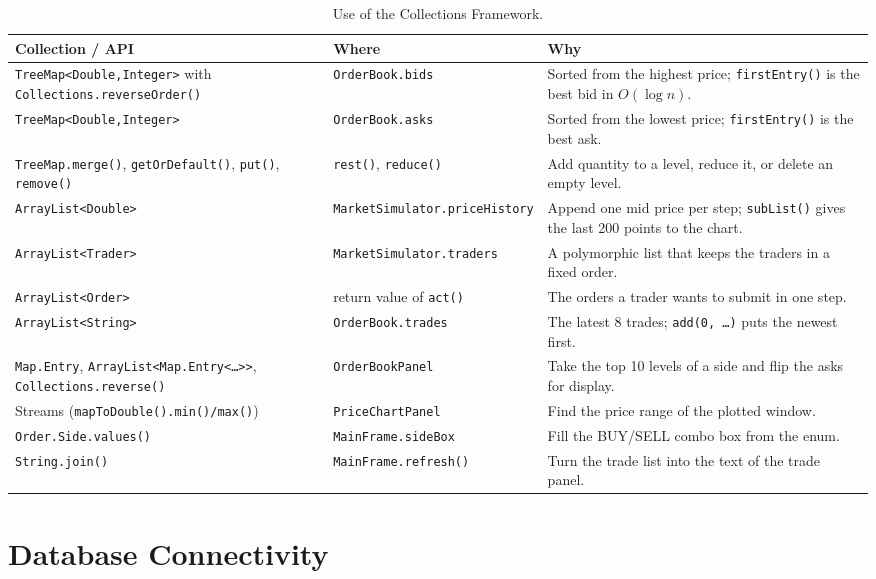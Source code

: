 \documentclass[12pt,a4paper,openany,oneside]{report}
\newcommand{\code}[1]{\texttt{#1}}
\begin{document}
\begin{table}[H]
\centering\small
\caption{Use of the Collections Framework.}
\label{tab:collections}
\begin{tabular}{@{}L{4.6cm} L{3.2cm} L{6.6cm}@{}}
\toprule
\textbf{Collection / API} & \textbf{Where} & \textbf{Why}\\
\midrule
\code{TreeMap<Double,\allowbreak Integer>} with \code{Collections.\allowbreak reverseOrder()} & \code{OrderBook.\allowbreak bids} & Sorted from the highest price; \code{firstEntry()} is the best bid in $O(\log n)$.\\
\code{TreeMap<Double,\allowbreak Integer>} & \code{OrderBook.\allowbreak asks} & Sorted from the lowest price; \code{firstEntry()} is the best ask.\\
\code{TreeMap.merge()}, \code{getOrDefault()}, \code{put()}, \code{remove()} & \code{rest()}, \code{reduce()} & Add quantity to a level, reduce it, or delete an empty level.\\
\code{ArrayList<Double>} & \code{MarketSimulator.\allowbreak priceHistory} & Append one mid price per step; \code{subList()} gives the last 200 points to the chart.\\
\code{ArrayList<Trader>} & \code{MarketSimulator.\allowbreak traders} & A polymorphic list that keeps the traders in a fixed order.\\
\code{ArrayList<Order>} & return value of \code{act()} & The orders a trader wants to submit in one step.\\
\code{ArrayList<String>} & \code{OrderBook.trades} & The latest 8 trades; \code{add(0, \ldots)} puts the newest first.\\
\code{Map.Entry}, \code{ArrayList<Map.\allowbreak Entry<\ldots>>}, \code{Collections.\allowbreak reverse()} & \code{OrderBookPanel} & Take the top 10 levels of a side and flip the asks for display.\\
Streams (\code{mapToDouble().\allowbreak min()/max()}) & \code{PriceChartPanel} & Find the price range of the plotted window.\\
\code{Order.Side.values()} & \code{MainFrame.\allowbreak sideBox} & Fill the BUY/SELL combo box from the enum.\\
\code{String.join()} & \code{MainFrame.\allowbreak refresh()} & Turn the trade list into the text of the trade panel.\\
\bottomrule
\end{tabular}
\end{table}

\section{Database Connectivity}
\end{document}
